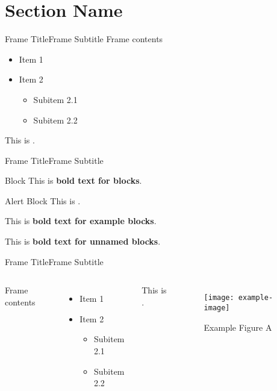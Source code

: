 \section{Section Name}
\graphicspath{{figs/section1/}} %

\begin{frame}{Frame Title}{Frame Subtitle}
	Frame contents
	\begin{itemize}
		\item Item 1
		\item Item 2
		      \begin{itemize}
			      \item Subitem 2.1
			      \item Subitem 2.2
		      \end{itemize}
	\end{itemize}
	This is .
\end{frame}

\begin{frame}{Frame Title}{Frame Subtitle}
	\begin{block}{Block}
		This is \textbf{bold text for blocks}.
	\end{block}
	\begin{alertblock}{Alert Block}
		This is .
	\end{alertblock}
	\begin{example}
		This is \textbf{bold text for example blocks}.
	\end{example}
	\begin{block}{}
		\centering
		This is \textbf{bold text for unnamed blocks}.
	\end{block}
\end{frame}

\begin{frame}{Frame Title}{Frame Subtitle}
	\begin{columns}
		Frame contents
		\begin{itemize}
			\item Item 1
			\item Item 2
			      \begin{itemize}
				      \item Subitem 2.1
				      \item Subitem 2.2
			      \end{itemize}
		\end{itemize}
		This is .
		\begin{figure}
			\begin{center}
				\texttt{[image: example-image]}
				\caption{Example Figure A}
			\end{center}
		\end{figure}
	\end{columns}
\end{frame}

